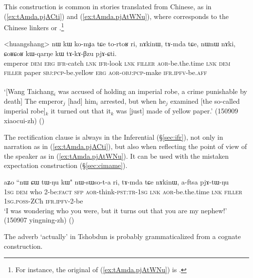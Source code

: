 This construction is common in stories translated from Chinese, as in (\ref{ex:tAmda.pjACti}) and (\ref{ex:tAmda.pjAtWNu}), where  corresponds to the Chinese linkers  or  .\footnote{For instance, the original of (\ref{ex:tAmda.pjAtWNu}) is . }  

\begin{exe}
\ex \label{ex:tAmda.pjACti}
\gll <huangshang> nɯ kɯ ko-mɟa tɕe to-rtoʁ ri, nɤkinɯ, tɤ-mda tɕe,  nɯnɯ nɤki, ɕoʁɕoʁ kɯ-qarŋe kɯ tɤ-kɤ-βzu pjɤ-ɕti. \\
emperor \textsc{dem} \textsc{erg} \textsc{ifr}-catch \textsc{lnk} \textsc{ifr}-look \textsc{lnk} \textsc{filler} \textsc{aor}-be.the.time \textsc{lnk} \textsc{dem} \textsc{filler} paper \textsc{sbj}:\textsc{pcp}-be.yellow \textsc{erg} \textsc{aor}-\textsc{obj}:\textsc{pcp}-make \textsc{ifr}.\textsc{ipfv}-be.\textsc{aff} \\
\\
\glt `[Wang Taichang$_i$ was accused of holding an imperial robe, a crime punishable by death] The emperor$_j$ [had] him$_i$ arrested, but when he$_j$ examined [the so-called imperial robe]$_k$ it turned out that it$_k$ was [just] made of yellow paper.' (150909 xiaocui-zh)
()
\end{exe} 
 
 The rectification clause is always in the Inferential (§\ref{sec:ifr}), not only in narration as in (\ref{ex:tAmda.pjACti}), but also when reflecting the point of view of the speaker as in (\ref{ex:tAmda.pjAtWNu}). It can be used with the mistaken expectation construction (§\ref{sec:cimame}).
 
\begin{exe}
\ex \label{ex:tAmda.pjAtWNu}
\gll  aʑo ``nɯ ɕɯ tɯ-ŋu kɯ" nɯ-sɯso-t-a ri,  tɤ-mda tɕe nɤkinɯ, a-ftsa pjɤ-tɯ-ŋu  \\
\textsc{1sg} \textsc{dem} who 2-be:\textsc{fact} \textsc{sfp} \textsc{aor}-think-\textsc{pst}:\textsc{tr}-\textsc{1sg} \textsc{lnk} \textsc{aor}-be.the.time \textsc{lnk} \textsc{filler} \textsc{1sg}.\textsc{poss}-ZCh \textsc{ifr}.\textsc{ipfv}-2-be \\
\glt `I was wondering who you were, but it turns out that you are my nephew!' (150907 yingning-zh)
()
\end{exe} 

The adverb  `actually' in Tshobdun \citep[44;802]{jackson19tshobdun} is probably grammaticalized from a cognate construction.

